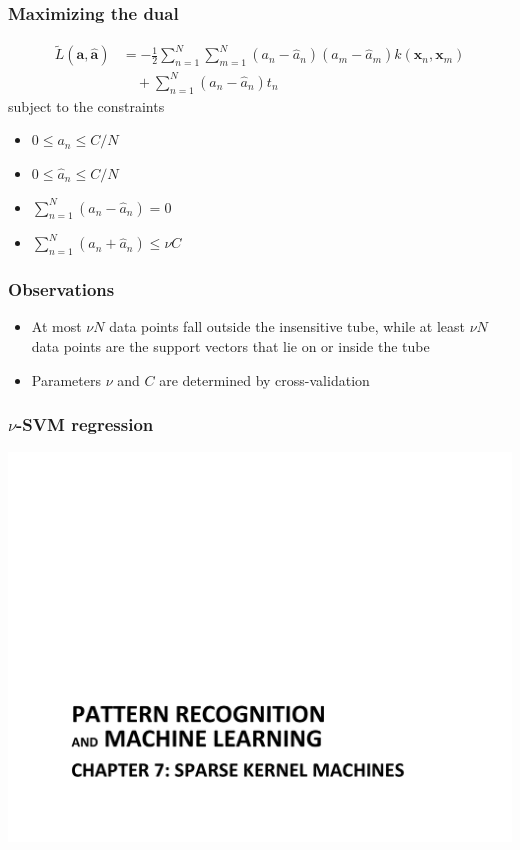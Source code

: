 \documentclass[t,14pt]{beamer}
\begin{document}
\begin{frame}
  \frametitle{Maximizing the dual}
  \vspace{-2em}
  \begin{align} 
    \widetilde{L}(\mathbf{a}, \widehat{\mathbf{a}}) &= 
        -\frac{\displaystyle 1}{\displaystyle 2}
        \sum\limits_{n=1}^N \sum\limits_{m=1}^N 
            (a_n - \widehat{a}_n)(a_m - \widehat{a}_m)
            k(\mathbf{x}_n,\mathbf{x}_m) \nonumber \\
            &\quad + \sum\limits_{n=1}^N(a_n - \widehat{a}_n)t_n
  \end{align}
  subject to the constraints
  \begin{multicols}{2}
  \begin{itemize}
    \item {$0 \leq a_n \leq C/N$}
    \item {$0 \leq \widehat{a}_n \leq C/N$}
    \item {$\sum\limits_{n=1}^N(a_n - \widehat{a}_n) = 0$} 
    \vfill
    \columnbreak
    \item {$\sum\limits_{n=1}^N(a_n + \widehat{a}_n) \leq \nu C$} 
  \end{itemize}
  \end{multicols}
\end{frame}

\begin{frame}
  \frametitle{Observations}
  \begin{itemize}
    \item{  
            At most $\nu N$ data points fall outside the insensitive tube, while 
            at least $\nu N$ data points are the support vectors that lie on or 
            inside the tube
         }
    \item {Parameters $\nu$ and $C$ are determined by cross-validation}
  \end{itemize}
\end{frame}

\begin{frame}
  \frametitle{$\nu$-SVM regression}
  \includegraphics[trim=2cm 0cm 0cm 5cm,clip,scale=0.5,page=10]{Chapter_7.pdf}
\end{frame}
\end{document}

